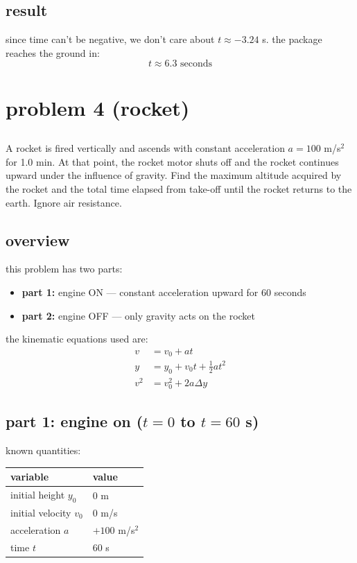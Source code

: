 \documentclass[12pt]{article}
\begin{document}
\subsection*{result}
since time can't be negative, we don't care about $t \approx -3.24$ s. the package reaches the ground in:
\[
\boxed{t \approx 6.3 \text{ seconds}}
\]

\section*{problem 4 (rocket)}

\subsection*{}
A rocket is fired vertically and ascends with constant acceleration $a = 100$ m/s$^2$ for 1.0 min.
At that point, the rocket motor shuts off and the rocket continues upward under the influence of gravity.
Find the maximum altitude acquired by the rocket and the total time elapsed from take-off until the
rocket returns to the earth. Ignore air resistance.

\subsection*{overview}
this problem has two parts:
\begin{itemize}
    \item \textbf{part 1:} engine ON — constant acceleration upward for 60 seconds
    \item \textbf{part 2:} engine OFF — only gravity acts on the rocket
\end{itemize}
the kinematic equations used are:
\begin{align}
    v &= v_0 + at \tag{1} \\
    y &= y_0 + v_0 t + \frac{1}{2}at^2 \tag{2} \\
    v^2 &= v_0^2 + 2a\Delta y \tag{3}
\end{align}

\subsection*{part 1: engine on ($t = 0$ to $t = 60$ s)}

known quantities:
\begin{center}
\begin{tabular}{ll}
    \hline
    variable & value \\
    \hline
    initial height $y_0$ & $0$ m \\
    initial velocity $v_0$ & $0$ m/s \\
    acceleration $a$ & $+100$ m/s$^2$ \\
    time $t$ & $60$ s \\
    \hline
\end{tabular}
\end{center}
\end{document}
